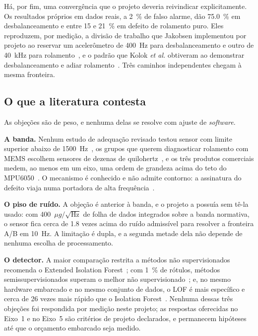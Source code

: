 \documentclass[11pt,a4paper]{article}
\newcommand{\dens}{\ensuremath{\mu g/\sqrt{\mathrm{Hz}}}}
\begin{document}
Há, por fim, uma convergência que o projeto deveria reivindicar explicitamente. Os
resultados próprios em dados reais, a \SI{2}{\percent} de falso alarme, dão
\SI{75,0}{\percent} em desbalanceamento e entre \num{15} e \SI{21}{\percent} em defeito de
rolamento puro. Eles reproduzem, por medição, a divisão de trabalho que Jakobsen
implementou por projeto ao reservar um acelerômetro de \SI{400}{\hertz} para
desbalanceamento e outro de \SI{40}{\kilo\hertz} para rolamento~\cite{jakobsen2024}, e o
padrão que Kolok \emph{et al.} obtiveram ao demonstrar desbalanceamento e adiar
rolamento~\cite{kolok2025}. Três caminhos independentes chegam à mesma fronteira.

\subsection{O que a literatura contesta}

As objeções são de peso, e nenhuma delas se resolve com ajuste de \emph{software}.

\textbf{A banda.} Nenhum estudo de adequação revisado testou sensor com limite superior
abaixo de \SI{1500}{\hertz}~\cite{albarbar2008}, os grupos que querem diagnosticar
rolamento com MEMS escolhem sensores de dezenas de
quilohertz~\cite{landi2023,jakobsen2024,sharma2024}, e os três produtos comerciais medem,
ao menos em um eixo, uma ordem de grandeza acima do teto do
MPU6050~\cite{bentlynevada2025,erbessd2025,tractian2022}. O mecanismo é conhecido e não
admite contorno: a assinatura do defeito viaja numa portadora de alta
frequência~\cite{randall2011,antoni2006,antoni2007}.

\textbf{O piso de ruído.} A objeção é anterior à banda, e o projeto a possuía sem tê-la
usado: com \num{400}~\dens{} de folha de dados integrados sobre a banda normativa, o
sensor fica cerca de \num{1,8} vezes acima do ruído admissível para resolver a fronteira
A/B em \SI{10}{\hertz}. A limitação é dupla, e a segunda metade dela não depende de
nenhuma escolha de processamento.

\textbf{O detector.} A maior comparação restrita a métodos não supervisionados recomenda o
Extended Isolation Forest~\cite{bouman2024}; com \SI{1}{\percent} de rótulos, métodos
semissupervisionados superam o melhor não supervisionado~\cite{han2022}; e, no mesmo
hardware embarcado e no mesmo conjunto de dados, o LOF é mais específico e cerca de
\num{26} vezes mais rápido que o Isolation Forest~\cite{chevtchenko2023}. Nenhuma dessas
três objeções foi respondida por medição neste projeto; as respostas oferecidas no Eixo~1 e
no Eixo~5 são critérios de projeto declarados, e permanecem hipóteses até que o orçamento
embarcado seja medido.
\end{document}
